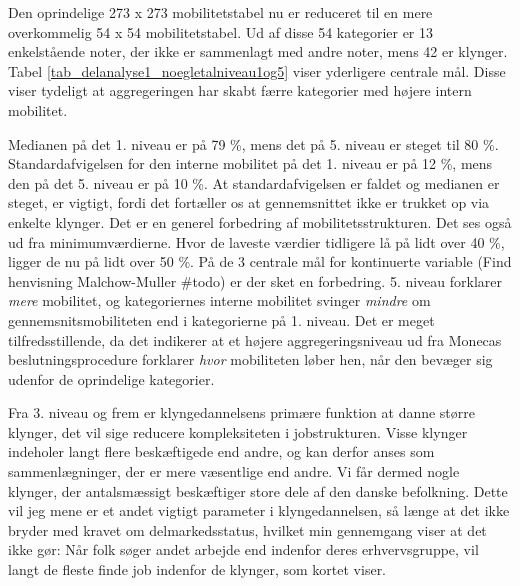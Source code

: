 Den oprindelige 273 x 273 mobilitetstabel nu er reduceret til en mere overkommelig 54 x 54 mobilitetstabel. Ud af disse 54 kategorier er 13 enkelstående noter, der ikke er sammenlagt med andre noter, mens 42 er klynger. Tabel \ref{tab_delanalyse1_noegletalniveau1og5} viser yderligere centrale mål. Disse viser tydeligt at aggregeringen har skabt færre kategorier med højere intern mobilitet.

%

%

Medianen på det 1. niveau er på 79 \%, mens det på 5. niveau er steget til 80 \%. Standardafvigelsen for den interne mobilitet på det 1. niveau er på 12 \%, mens den på det 5. niveau er på 10 \%. At standardafvigelsen er faldet og medianen er steget, er vigtigt, fordi det fortæller os at gennemsnittet ikke er trukket op via enkelte klynger.  Det er en generel forbedring af mobilitetsstrukturen. Det ses også ud fra minimumværdierne. Hvor de laveste værdier tidligere lå på lidt over 40 \%, ligger de nu på lidt over 50 \%. På de 3 centrale mål for kontinuerte variable (Find henvisning Malchow-Muller \#todo) er der sket en forbedring. 5. niveau forklarer \emph{mere} mobilitet, og kategoriernes interne mobilitet svinger \emph{mindre} om gennemsnitsmobiliteten end i kategorierne på 1. niveau. Det er meget tilfredsstillende, da det indikerer at et højere aggregeringsniveau ud fra Monecas beslutningsprocedure forklarer \emph{hvor} mobiliteten løber hen, når den bevæger sig udenfor de oprindelige kategorier.  %

Fra 3. niveau og frem er klyngedannelsens primære funktion at danne større klynger, det vil sige reducere kompleksiteten i jobstrukturen. Visse klynger indeholer langt flere beskæftigede end andre, og kan derfor anses som sammenlægninger, der er mere væsentlige end andre. Vi får dermed nogle klynger, der antalsmæssigt beskæftiger store dele af den danske befolkning. Dette vil jeg mene er et andet vigtigt parameter i klyngedannelsen, så længe at det ikke bryder med kravet om delmarkedsstatus, hvilket min gennemgang viser at det ikke gør: Når folk søger andet arbejde end indenfor deres erhvervsgruppe, vil langt de fleste finde job indenfor de klynger, som kortet viser. 


